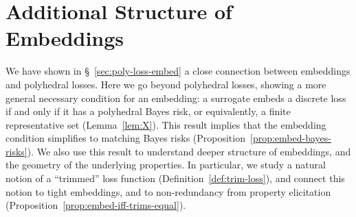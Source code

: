 \documentclass[11pt]{article}
\newcommand{\Comments}{1}
\newcommand{\mynote}[2]{\ifnum\Comments=1\textcolor{#1}{#2}\fi}
\newcommand{\jessie}[1]{\mynote{teal}{[JF: #1]}}
\newcommand{\prop}[1]{\mathrm{prop}[#1]}
\newcommand{\elltopk}{\ell^{\text{top-$k$}}}
\begin{document}






\section{Additional Structure of Embeddings}
\label{sec:min-rep-sets}

We have shown in \S~\ref{sec:poly-loss-embed} a close connection between embeddings and polyhedral losses.
Here we go beyond polyhedral losses, showing a more general necessary condition for an embedding: a surrogate embeds a discrete loss if and only if it has a polyhedral Bayes risk, or equivalently, a finite representative set (Lemma~\ref{lem:X}).
This result implies that the embedding condition simplifies to matching Bayes risks (Proposition~\ref{prop:embed-bayes-risks}).
We also use this result to understand deeper structure of embeddings, and the geometry of the underlying properties. %
In particular, we study a natural notion of a ``trimmed'' loss function (Definition~\ref{def:trim-loss}), and connect this notion to tight embeddings, and to non-redundancy from property elicitation (Proposition~\ref{prop:embed-iff-trims-equal}).
 
\end{document}
